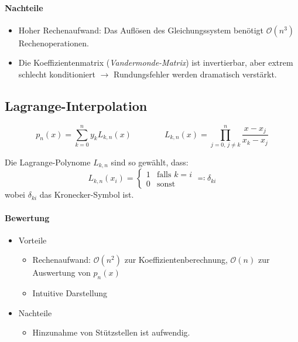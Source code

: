 			\paragraph{Nachteile}
				\begin{itemize}
					\item Hoher Rechenaufwand: Das Auflösen des Gleichungssystem benötigt \( \mathcal{O}(n^3) \) Rechenoperationen.
					\item Die Koeffizientenmatrix (\textit{Vandermonde-Matrix}) ist invertierbar, aber extrem schlecht konditioniert \(\rightarrow\) Rundungsfehler werden dramatisch verstärkt.
				\end{itemize}

		\subsection{Lagrange-Interpolation}
			\begin{equation*}
				p_n(x) = \sum_{k = 0}^n y_k L_{k,n}(x) \qquad\qquad L_{k,n}(x) = \prod_{j = 0,\, j \neq k}^n \frac{x - x_j}{x_k - x_j}
			\end{equation*}

			Die Lagrange-Polynome \( L_{k,n} \) sind so gewählt, dass:
			\begin{equation*}
				L_{k,n}(x_i) =
				\begin{cases}
					1 & \text{falls } k = i \\
					0 & \text{sonst}
				\end{cases}
				\eqqcolon \delta_{ki}
			\end{equation*}
			wobei \( \delta_{ki} \) das Kronecker-Symbol ist.

			\paragraph{Bewertung}
				\begin{itemize}
					\item Vorteile
						\begin{itemize}
							\item Rechenaufwand: \( \mathcal{O}(n^2) \) zur Koeffizientenberechnung, \( \mathcal{O}(n) \) zur Auswertung von \( p_n(x) \)
							\item Intuitive Darstellung
						\end{itemize}
					\item Nachteile
						\begin{itemize}
							\item Hinzunahme von Stützstellen ist aufwendig.
						\end{itemize}
				\end{itemize}

